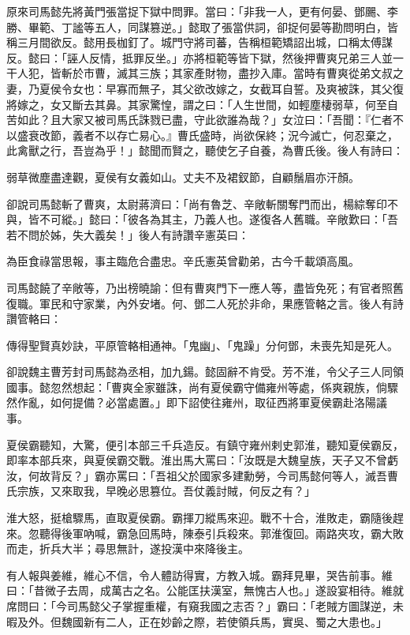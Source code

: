 原來司馬懿先將黃門張當捉下獄中問罪。當曰：「非我一人，更有何晏、鄧颺、李勝、畢範、丁謐等五人，同謀篡逆。」懿取了張當供詞，卻捉何晏等勘問明白，皆稱三月間欲反。懿用長枷釘了。城門守將司蕃，告稱桓範矯詔出城，口稱太傅謀反。懿曰：「誣人反情，抵罪反坐。」亦將桓範等皆下獄，然後押曹爽兄弟三人並一干人犯，皆斬於市曹，滅其三族；其家產財物，盡抄入庫。當時有曹爽從弟文叔之妻，乃夏侯令女也：早寡而無子，其父欲改嫁之，女截耳自誓。及爽被誅，其父復將嫁之，女又斷去其鼻。其家驚惶，謂之曰：「人生世間，如輕塵棲弱草，何至自苦如此？且大家又被司馬氏誅戮已盡，守此欲誰為哉？」女泣曰：「吾聞：『仁者不以盛衰改節，義者不以存亡易心。』曹氏盛時，尚欲保終；況今滅亡，何忍棄之，此禽獸之行，吾豈為乎！」懿聞而賢之，聽使乞子自養，為曹氏後。後人有詩曰：

弱草微塵盡達觀，夏侯有女義如山。丈夫不及裙釵節，自顧鬚眉亦汗顏。

卻說司馬懿斬了曹爽，太尉蔣濟曰：「尚有魯芝、辛敞斬關奪門而出，楊綜奪印不與，皆不可縱。」懿曰：「彼各為其主，乃義人也。遂復各人舊職。辛敞歎曰：「吾若不問於姊，失大義矣！」後人有詩讚辛憲英曰：

為臣食祿當思報，事主臨危合盡忠。辛氏憲英曾勸弟，古今千載頌高風。

司馬懿饒了辛敞等，乃出榜曉諭：但有曹爽門下一應人等，盡皆免死；有官者照舊復職。軍民和守家業，內外安堵。何、鄧二人死於非命，果應管輅之言。後人有詩讚管輅曰：

傳得聖賢真妙訣，平原管輅相通神。「鬼幽」、「鬼躁」分何鄧，未喪先知是死人。

卻說魏主曹芳封司馬懿為丞相，加九鍚。懿固辭不肯受。芳不淮，令父子三人同領國事。懿忽然想起：「曹爽全家雖誅，尚有夏侯霸守備雍州等處，係爽親族，倘驟然作亂，如何提備？必當處置。」即下詔使往雍州，取征西將軍夏侯霸赴洛陽議事。

夏侯霸聽知，大驚，便引本部三千兵造反。有鎮守雍州剌史郭淮，聽知夏侯霸反，即率本部兵來，與夏侯霸交戰。淮出馬大罵曰：「汝既是大魏皇族，天子又不曾虧汝，何故背反？」霸亦罵曰：「吾祖父於國家多建勳勞，今司馬懿何等人，滅吾曹氏宗族，又來取我，早晚必思篡位。吾仗義討賊，何反之有？」

淮大怒，挺槍驟馬，直取夏侯霸。霸揮刀縱馬來迎。戰不十合，淮敗走，霸隨後趕來。忽聽得後軍吶喊，霸急回馬時，陳泰引兵殺來。郭淮復回。兩路夾攻，霸大敗而走，折兵大半；尋思無計，遂投漢中來降後主。

有人報與姜維，維心不信，令人體訪得實，方教入城。霸拜見畢，哭告前事。維曰：「昔微子去周，成萬古之名。公能匡扶漢室，無愧古人也。」遂設宴相待。維就席問曰：「今司馬懿父子掌握重權，有窺我國之志否？」霸曰：「老賊方圖謀逆，未暇及外。但魏國新有二人，正在妙齡之際，若使領兵馬，實吳、蜀之大患也。」

